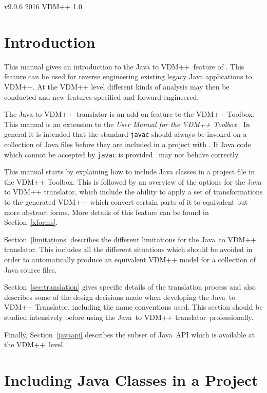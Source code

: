 \documentclass[\pformat,12pt]{article}
\newcommand{\vdmslpp}{VDM++}
\newcommand{\ToolboxName}{VDM++ Toolbox}
\newcommand{\vdmtoolsver}{v9.0.6}
\newcommand{\JAVA}{Java}
\newcommand{\tjTov}{the \JAVA\ to VDM++ translator}
\newcommand{\VDM}{VDM++}
\newcommand{\jTov}{\JAVA\ to VDM++ Translator}
\begin{document}
\vdmtoolsmanualcsk{The Java to \vdmslpp\ User Manual}
       {\vdmtoolsver}
       {2016}
       {\vdmslpp}
       {1.0}
 

\section{Introduction} \label{sec:introduction}

This manual gives an introduction to the Java to \vdmslpp\ feature
of \VDMTools. This feature can be used for reverse
engineering existing legacy Java applications to VDM++. At the VDM++
level different kinds of analysis may then be conducted and new
features specified and forward engineered.

The Java to \vdmslpp\ translator is an add-on feature to the
\ToolboxName{}. This manual is an extension to the {\em User Manual
  for the VDM++ Toolbox} \cite{UserManPP-CSK}. In general it is
intended that the standard \texttt{javac} should always be invoked on
a collection of Java files 
before they are included in a project with \VDMTools. If Java code
which cannot be accepted by \texttt{javac} is provided \VDMTools\ may
not behave correctly.

This manual starts by explaining how to include Java classes in a
project file in the \ToolboxName{}. This is followed by an overview of the
options for the Java to VDM++ translator, which include the ability to
apply a set of transformations to the generated \vdmslpp\ which
convert certain parts of it to equivalent but more abstract
forms. More details of this feature can be found in Section~\ref{xforms}.

Section~\ref{limitations} describes the different limitations for \tjTov{}.
This includes all the different situations which should be
avoided in order to automatically produce an equivalent VDM++ model
for a collection of Java source files.

Section~\ref{sec:translation}  gives specific details of the
translation process and also describes some of the design decisions
made when developing the \jTov{}, including the name conventions
used. This section should be studied intensively before using \tjTov\ 
professionally.

Finally, Section~\ref{javaapi} describes the subset of \JAVA\ API
which is available at the \VDM\ level. 

\section{Including Java Classes in a Project}
\end{document}
